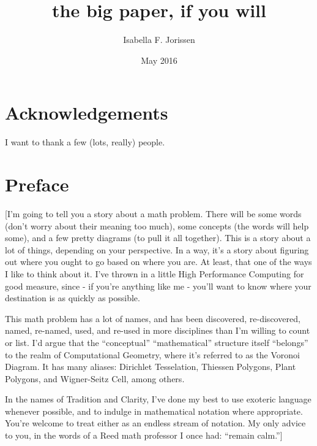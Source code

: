 \documentclass[12pt,twoside]{reedthesis}
\title{the big paper, if you will}
\author{Isabella F. Jorissen}
\date{May 2016}
\begin{document}
  \maketitle
  \frontmatter %
  \pagestyle{empty} %

    \chapter*{Acknowledgements}
	I want to thank a few (lots, really) people.

    \chapter*{Preface}
    [I'm going to tell you a story about a math problem. There will be some words (don't worry about their meaning too much), some concepts (the words will help some), and a few pretty diagrams (to pull it all together). This is a story about a lot of things, depending on your perspective. In a way, it's a story about figuring out where you ought to go based on where you are. At least, that one of the ways I like to think about it. I've thrown in a little High Performance Computing for good measure, since - if you're anything like me - you'll want to know where your destination is as quickly as possible.

    This math problem has a lot of names, and has been discovered, re-discovered, named, re-named, used, and re-used in more disciplines than I'm willing to count or list. I'd argue that the ``conceptual'' ``mathematical'' structure itself ``belongs'' to the realm of Computational Geometry, where it's referred to as the Voronoi Diagram. It has many aliases: Dirichlet Tesselation, Thiessen Polygons, Plant Polygons, and Wigner-Seitz Cell, among others. 

    In the names of Tradition and Clarity, I've done my best to use exoteric language whenever possible, and to indulge in mathematical notation where appropriate. You're welcome to treat either as an endless stream of notation. My only advice to you, in the words of a Reed math professor I once had: ``remain calm.'']


\end{document}
